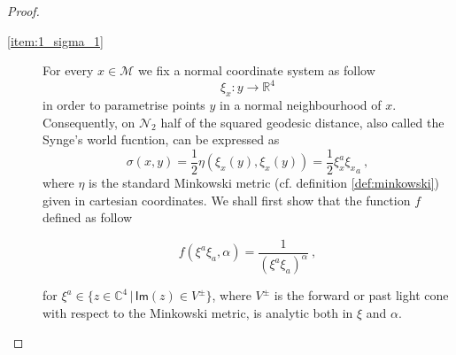 \documentclass[11pt]{book}
\renewcommand{\Im}{\mathsf{Im}}
\newcommand{\Mcal}{\mathcal{M}}
\newcommand{\Ncal}{\mathcal{N}}
\newcommand{\Rbb}{\mathbb{R}}
\theoremstyle{break}
\begin{document}
\begin{proof}
\begin{description}
\item[\ref{item:1_sigma_1}] For every $x \in \Mcal$ we fix a normal coordinate system as follow
%
\begin{equation}
\xi_x : y \to \Rbb^4 
\label{eq:normal_coord}
\end{equation}
%
in order to parametrise points $y$ in a normal neighbourhood of $x$. Consequently, on $\Ncal_2$ half of the squared geodesic distance, also called the Synge's world fucntion, can be expressed as
%
\begin{equation}
\sigma(x,y)= \frac{1}{2}\eta(\xi_x(y),\xi_x(y)) = \frac{1}{2}\xi_x^{a}{\xi_x}_{a} \ , 
\label{eq:sigma_normal_coord}
\end{equation}
%
where $\eta$ is the standard Minkowski metric (cf. definition \ref{def:minkowski}) given in cartesian coordinates. We shall first show that the function $f$ defined as follow

\begin{equation}
f(\xi^a\xi_{a},\alpha) = \frac{1}{(\xi^{a}\xi_{a})^\alpha} \ , 
\label{sigma_reg_normal_coord}
\end{equation}

for $\xi^{a} \in \{z\in \mathbb{C}^4 \,|\,\Im(z) \in V^\pm \}$, where $V^\pm$ is the forward or past light cone with respect to the Minkowski metric, is  analytic both in $\xi$ and $\alpha$.



\end{description}
\end{proof}
\end{document}
